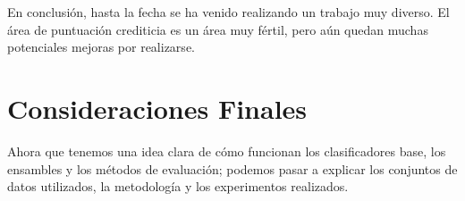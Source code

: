 En conclusión, hasta la fecha se ha venido realizando un trabajo muy diverso. El área de puntuación crediticia es un área muy fértil, pero aún quedan muchas potenciales mejoras por realizarse.

\section{Consideraciones Finales}

Ahora que tenemos una idea clara de cómo funcionan los clasificadores base, los ensambles y los métodos de evaluación; podemos pasar a explicar los conjuntos de datos utilizados, la metodología y los experimentos realizados.
